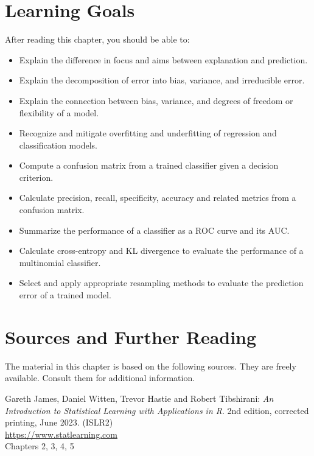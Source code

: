 %
%
\section*{Learning Goals}

After reading this chapter, you should be able to:
\begin{itemize}
   \item Explain the difference in focus and aims between explanation and prediction.
   \item Explain the decomposition of error into bias, variance, and irreducible error.
   \item Explain the connection between bias, variance, and degrees of freedom or flexibility of a model.
   \item Recognize and mitigate overfitting and underfitting of regression and classification models.
   \item Compute a confusion matrix from a trained classifier given a decision criterion.
   \item Calculate precision, recall, specificity, accuracy and related metrics from a confusion matrix.
   \item Summarize the performance of a classifier as a ROC curve and its AUC.
   \item Calculate cross-entropy and KL divergence to evaluate the performance of a multinomial classifier.
   \item Select and apply appropriate resampling methods to evaluate the prediction error of a trained model.
\end{itemize}

\section*{Sources and Further Reading}

The material in this chapter is based on the following sources. They are freely available. Consult them for additional information.

\begin{resourcebox}
Gareth James, Daniel Witten, Trevor Hastie and Robert Tibshirani: \emph{An Introduction to Statistical Learning with Applications in R}. 2nd edition, corrected printing, June 2023. (ISLR2) \\

\url{https://www.statlearning.com} \\

Chapters 2, 3, 4, 5
\end{resourcebox}

